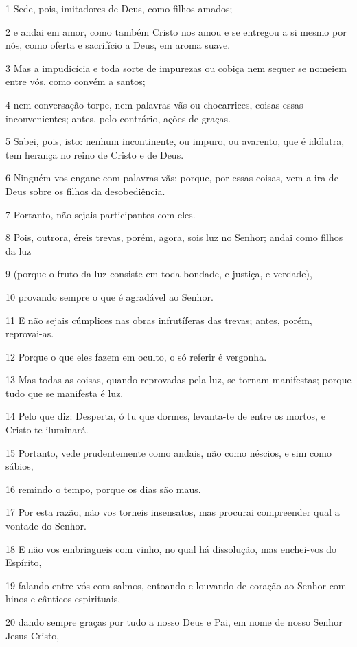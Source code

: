 \par 1 Sede, pois, imitadores de Deus, como filhos amados;
\par 2 e andai em amor, como também Cristo nos amou e se entregou a si mesmo por nós, como oferta e sacrifício a Deus, em aroma suave.
\par 3 Mas a impudicícia e toda sorte de impurezas ou cobiça nem sequer se nomeiem entre vós, como convém a santos;
\par 4 nem conversação torpe, nem palavras vãs ou chocarrices, coisas essas inconvenientes; antes, pelo contrário, ações de graças.
\par 5 Sabei, pois, isto: nenhum incontinente, ou impuro, ou avarento, que é idólatra, tem herança no reino de Cristo e de Deus.
\par 6 Ninguém vos engane com palavras vãs; porque, por essas coisas, vem a ira de Deus sobre os filhos da desobediência.
\par 7 Portanto, não sejais participantes com eles.
\par 8 Pois, outrora, éreis trevas, porém, agora, sois luz no Senhor; andai como filhos da luz
\par 9 (porque o fruto da luz consiste em toda bondade, e justiça, e verdade),
\par 10 provando sempre o que é agradável ao Senhor.
\par 11 E não sejais cúmplices nas obras infrutíferas das trevas; antes, porém, reprovai-as.
\par 12 Porque o que eles fazem em oculto, o só referir é vergonha.
\par 13 Mas todas as coisas, quando reprovadas pela luz, se tornam manifestas; porque tudo que se manifesta é luz.
\par 14 Pelo que diz: Desperta, ó tu que dormes, levanta-te de entre os mortos, e Cristo te iluminará.
\par 15 Portanto, vede prudentemente como andais, não como néscios, e sim como sábios,
\par 16 remindo o tempo, porque os dias são maus.
\par 17 Por esta razão, não vos torneis insensatos, mas procurai compreender qual a vontade do Senhor.
\par 18 E não vos embriagueis com vinho, no qual há dissolução, mas enchei-vos do Espírito,
\par 19 falando entre vós com salmos, entoando e louvando de coração ao Senhor com hinos e cânticos espirituais,
\par 20 dando sempre graças por tudo a nosso Deus e Pai, em nome de nosso Senhor Jesus Cristo,
